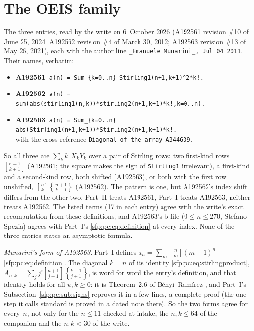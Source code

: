 \documentclass[11pt,letterpaper]{article}
\numberwithin{equation}{section}
\theoremstyle{definition}\newtheorem{definition}[theorem]{Definition}
\theoremstyle{remark}\newtheorem{remark}[theorem]{Remark}
\newcommand{\sone}[2]{\genfrac{[}{]}{0pt}{}{#1}{#2}}
\newcommand{\stwo}[2]{\genfrac{\{} {\}}{0pt}{}{#1}{#2}}
\begin{document}
\section*{The OEIS family}\label{sfp:sec:oeis}
The three entries, read by the write on 6~October 2026 (A192561 revision \#10 of June 25, 2024; A192562 revision \#4 of March 30, 2012; A192563 revision \#13 of May 26, 2021), each with the author line \verb!_Emanuele Munarini_, Jul 04 2011!. Their names, verbatim:
\begin{itemize}
\item \textbf{A192561}: \verb|a(n) = Sum_{k=0..n} Stirling1(n+1,k+1)^2*k!.|
\item \textbf{A192562}: \verb|a(n) = sum(abs(stirling1(n,k))*stirling2(n+1,k+1)*k!,k=0..n).|
\item \textbf{A192563}: \verb|a(n) = Sum_{k=0..n} abs(Stirling1(n+1,k+1))*Stirling2(n+1,k+1)*k!.|\\
with the cross-reference \verb!Diagonal of the array A344639.!
\end{itemize}
So all three are $\sum_kk!\,X_kY_k$ over a pair of Stirling rows: two first-kind rows $\sone{n+1}{k+1}$ (A192561; the square makes the sign of \texttt{Stirling1} irrelevant), a first-kind and a second-kind row, both shifted (A192563), or both with the first row unshifted, $\sone nk\stwo{n+1}{k+1}$ (A192562). The pattern is one, but A192562's index shift differs from the other two. Part~II treats A192561, Part~I treats A192563, neither treats A192562. The listed terms (17 in each entry) agree with the write's exact recomputation from these definitions, and A192563's b-file ($0\le n\le270$, Stefano Spezia) agrees with Part~I's \eqref{sfp:pc:eq:definition} at every index. None of the three entries states an asymptotic formula.

\emph{Munarini's form of A192563.} Part~I defines $a_n=\sum_m\sone nm(m+1)^n$ \eqref{sfp:pc:eq:definition}. The diagonal $k=n$ of its identity \eqref{sfp:pc:eq:stirlingproduct}, $A_{n,k}=\sum_jj!\sone{n+1}{j+1}\stwo{k+1}{j+1}$, is word for word the entry's definition, and that identity holds for all $n,k\ge0$: it is Theorem~2.6 of B\'enyi--Ram\'irez \cite{benyi}, and Part~I's Subsection~\ref{sfp:pc:sub:signs} reproves it in a few lines, a complete proof (the one step it calls standard is proved in a dated note there). So the two forms agree for every~$n$, not only for the $n\le11$ checked at intake, the $n,k\le64$ of the companion and the $n,k<30$ of the write.
\end{document}
